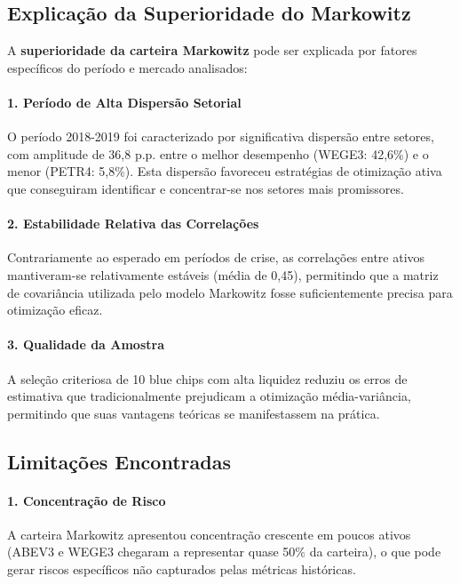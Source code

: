 \subsection{Explicação da Superioridade do Markowitz}

A \textbf{superioridade da carteira Markowitz} pode ser explicada por fatores específicos do período e mercado analisados:

\paragraph{1. Período de Alta Dispersão Setorial}
O período 2018-2019 foi caracterizado por significativa dispersão entre setores, com amplitude de 36,8 p.p. entre o melhor desempenho (WEGE3: 42,6\%) e o menor (PETR4: 5,8\%). Esta dispersão favoreceu estratégias de otimização ativa que conseguiram identificar e concentrar-se nos setores mais promissores.

\paragraph{2. Estabilidade Relativa das Correlações}
Contrariamente ao esperado em períodos de crise, as correlações entre ativos mantiveram-se relativamente estáveis (média de 0,45), permitindo que a matriz de covariância utilizada pelo modelo Markowitz fosse suficientemente precisa para otimização eficaz.

\paragraph{3. Qualidade da Amostra}
A seleção criteriosa de 10 blue chips com alta liquidez reduziu os erros de estimativa que tradicionalmente prejudicam a otimização média-variância, permitindo que suas vantagens teóricas se manifestassem na prática.

\subsection{Limitações Encontradas}

\paragraph{1. Concentração de Risco}
A carteira Markowitz apresentou concentração crescente em poucos ativos (ABEV3 e WEGE3 chegaram a representar quase 50\% da carteira), o que pode gerar riscos específicos não capturados pelas métricas históricas.

